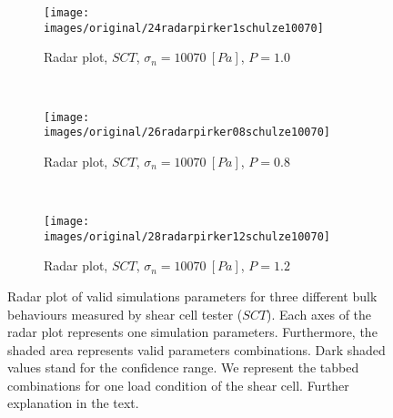 \begin{figure}[htp] \centering
    \begin{subfigure}[b]{0.5\columnwidth}
        \texttt{[image: images/original/24radarpirker1schulze10070]}
        \caption{Radar plot, $SCT$, $\sigma_n=10070 ~[Pa]$, $P=1.0$}
        \label{fig:24radarpirker1schulze10070}
    \end{subfigure} \\
        \begin{subfigure}[b]{0.5\columnwidth}
        \texttt{[image: images/original/26radarpirker08schulze10070]}
        \caption{Radar plot, $SCT$, $\sigma_n=10070 ~[Pa]$, $P=0.8$}
        \label{fig:26radarpirker08schulze10070} 
    \end{subfigure}\\
        \begin{subfigure}[b]{0.5\columnwidth}
        \texttt{[image: images/original/28radarpirker12schulze10070]}
        \caption{Radar plot, $SCT$, $\sigma_n=10070 ~[Pa]$, $P=1.2$}
        \label{fig:28radarpirker12schulze10070} 
    \end{subfigure}
    \caption[Radar plot of valid simulations parameters for three different
    bulk behaviours measured by SCT]{Radar plot of valid simulations parameters for three different
    bulk behaviours measured by shear cell tester ($SCT$).
    Each axes of the radar plot represents one simulation parameters.
    Furthermore, the shaded area represents valid parameters combinations.
    Dark shaded values stand for the confidence range.
    We represent the tabbed combinations for one load condition of the shear cell. 
    Further explanation in the text.
   }
    \label{fig:29schulzeradarandcloud}
\end{figure}
% 
